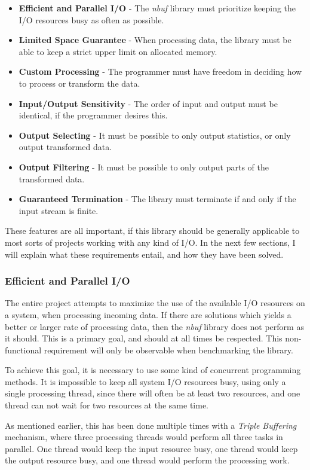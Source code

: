 \documentclass[a4paper]{article}
\newcommand{\nbuf}{\textit{nbuf} }
\begin{document}
\begin{itemize}
\item \textbf{Efficient and Parallel I/O} - The \nbuf library must prioritize keeping the I/O resources busy as often as possible.
\item \textbf{Limited Space Guarantee} - When processing data, the library must be able to keep a strict upper limit on allocated memory.
\item \textbf{Custom Processing} - The programmer must have freedom in deciding how to process or transform the data.
\item \textbf{Input/Output Sensitivity} - The order of input and output must be identical, if the programmer desires this.
\item \textbf{Output Selecting} - It must be possible to only output statistics, or only output transformed data.
\item \textbf{Output Filtering} - It must be possible to only output parts of the transformed data.
\item \textbf{Guaranteed Termination} - The library must terminate if and only if the input stream is finite.
\end{itemize}

These features are all important, if this library should be generally applicable to most sorts of projects working with any kind of I/O. In the next few sections, I will explain what these requirements entail, and how they have been solved.

\subsubsection{Efficient and Parallel I/O}
The entire project attempts to maximize the use of the available I/O resources on a system, when processing incoming data. If there are solutions which yields a better or larger rate of processing data, then the \nbuf library does not perform as it should. This is a primary goal, and should at all times be respected. This non-functional requirement will only be observable when benchmarking the library.

To achieve this goal, it is necessary to use some kind of concurrent programming methods. It is impossible to keep all system I/O resources busy, using only a single processing thread, since there will often be at least two resources, and one thread can not wait for two resources at the same time. 

As mentioned earlier, this has been done multiple times with a \textit{Triple Buffering} mechanism, where three processing threads would perform all three tasks in parallel. One thread would keep the input resource busy, one thread would keep the output resource busy, and one thread would perform the processing work.\\
 
\end{document}
